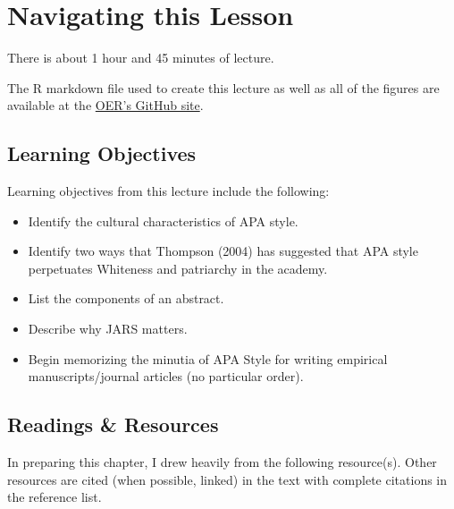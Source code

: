 \documentclass[
  english,
]{book}
\providecommand{\tightlist}{%
  \setlength{\itemsep}{0pt}\setlength{\parskip}{0pt}}
\begin{document}
\hypertarget{navigating-this-lesson-6}{%
\section{Navigating this Lesson}\label{navigating-this-lesson-6}}

There is about 1 hour and 45 minutes of lecture.

The R markdown file used to create this lecture as well as all of the figures are available at the \href{https://github.com/lhbikos/ReC_Topics}{OER's GitHub site}.

\hypertarget{learning-objectives-6}{%
\subsection{Learning Objectives}\label{learning-objectives-6}}

Learning objectives from this lecture include the following:

\begin{itemize}
\tightlist
\item
  Identify the cultural characteristics of APA style.
\item
  Identify two ways that Thompson (2004) has suggested that APA style perpetuates Whiteness and patriarchy in the academy.
\item
  List the components of an abstract.
\item
  Describe why JARS matters.
\item
  Begin memorizing the minutia of APA Style for writing empirical manuscripts/journal articles (no particular order).
\end{itemize}

\hypertarget{readings-resources-6}{%
\subsection{Readings \& Resources}\label{readings-resources-6}}

In preparing this chapter, I drew heavily from the following resource(s). Other resources are cited (when possible, linked) in the text with complete citations in the reference list.
\end{document}
